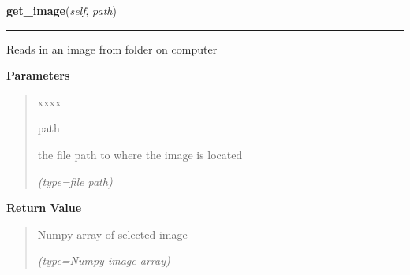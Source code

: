     \label{client_gui:GuiClass:get_image}

    \vspace{0.5ex}

\hspace{.8\funcindent}\begin{boxedminipage}{\funcwidth}

    \raggedright \textbf{get\_image}(\textit{self}, \textit{path})

    \vspace{-1.5ex}

    \rule{\textwidth}{0.5\fboxrule}
\setlength{\parskip}{2ex}
    Reads in an image from folder on computer

\setlength{\parskip}{1ex}
      \textbf{Parameters}
      \vspace{-1ex}

      \begin{quote}
        \begin{Ventry}{xxxx}

          \item[path]

          the file path to where the image is located

            {\it (type=file path)}

        \end{Ventry}

      \end{quote}

      \textbf{Return Value}
    \vspace{-1ex}

      \begin{quote}
      Numpy array of selected image

      {\it (type=Numpy image array)}

      \end{quote}

    \end{boxedminipage}

    \label{client_gui:GuiClass:np2im}

    \vspace{0.5ex}

